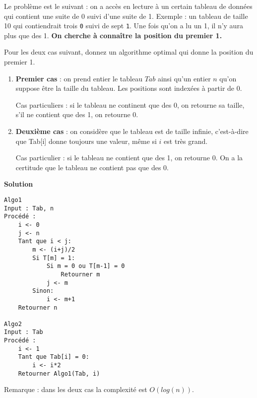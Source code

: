 
\begin{exercice}
Le problème est le suivant : on a accès en lecture à un certain tableau de données qui contient une suite
de 0 suivi d'une suite de 1. Exemple : un tableau de taille 10 qui contiendrait trois {\tt 0} suivi de sept {\tt 1}. 
Une fois qu'on a lu un 1, il n'y aura plus que des 1. 
\textbf{On cherche à connaître la position du premier 1.}

Pour les deux cas suivant, donnez un algorithme optimal qui donne la position du premier 1.

\begin{enumerate}
\item \textbf{Premier cas} : on prend entier le tableau $Tab$ ainsi qu'un entier $n$ qu'on suppose être la taille du tableau.
Les positions sont indexées à partir de 0. 

Cas particuliers : si le tableau ne continent que des 0, on retourne sa taille, s'il ne contient que des 1, on retourne 0.
\item \textbf{Deuxième cas} : on considère que le tableau est de taille infinie, c'est-à-dire que Tab[i] donne toujours une valeur, 
même si $i$ est très grand. 

Cas particulier : si le tableau ne contient que des 1, on retourne 0. On a la certitude que le tableau ne contient pas que des 0.
\end{enumerate}

\textbf{Solution}

\begin{lstlisting}
Algo1
Input : Tab, n
Procédé :
    i <- 0
    j <- n
    Tant que i < j:
        m <- (i+j)/2
        Si T[m] = 1:
            Si m = 0 ou T[m-1] = 0
                Retourner m
            j <- m
        Sinon:
            i <- m+1
    Retourner n
    
Algo2
Input : Tab
Procédé :
    i <- 1 
    Tant que Tab[i] = 0:
        i <- i*2
    Retourner Algo1(Tab, i)
\end{lstlisting}

Remarque : dans les deux cas la complexité est $O(log(n))$.
\end{exercice}

